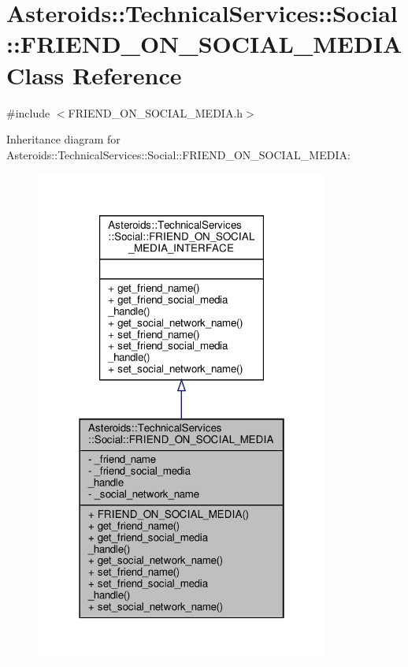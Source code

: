 \hypertarget{classAsteroids_1_1TechnicalServices_1_1Social_1_1FRIEND__ON__SOCIAL__MEDIA}{}\section{Asteroids\+:\+:Technical\+Services\+:\+:Social\+:\+:F\+R\+I\+E\+N\+D\+\_\+\+O\+N\+\_\+\+S\+O\+C\+I\+A\+L\+\_\+\+M\+E\+D\+IA Class Reference}
\label{classAsteroids_1_1TechnicalServices_1_1Social_1_1FRIEND__ON__SOCIAL__MEDIA}


{\ttfamily \#include $<$F\+R\+I\+E\+N\+D\+\_\+\+O\+N\+\_\+\+S\+O\+C\+I\+A\+L\+\_\+\+M\+E\+D\+I\+A.\+h$>$}



Inheritance diagram for Asteroids\+:\+:Technical\+Services\+:\+:Social\+:\+:F\+R\+I\+E\+N\+D\+\_\+\+O\+N\+\_\+\+S\+O\+C\+I\+A\+L\+\_\+\+M\+E\+D\+IA\+:
\nopagebreak
\begin{figure}[H]
\begin{center}
\leavevmode
\includegraphics[width=274pt]{classAsteroids_1_1TechnicalServices_1_1Social_1_1FRIEND__ON__SOCIAL__MEDIA__inherit__graph}
\end{center}
\end{figure}


